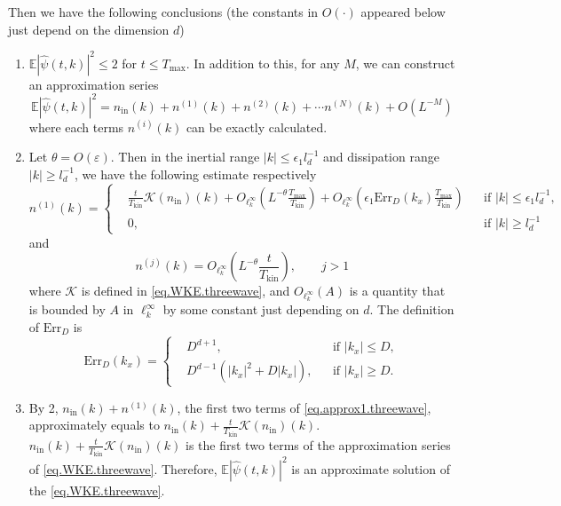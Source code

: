 \begin{thm}
Then we have the following conclusions (the constants in $O(\cdot)$ appeared below just depend on the dimension $d$)
\begin{enumerate}
    \item $\mathbb E |\widehat \psi(t, k)|^2\le 2$ for $t\le T_{\text{max}}$. In addition to this, for any $M$, we can construct an approximation series 
    \begin{equation}\label{eq.approx1.threewave}
        \mathbb E |\widehat \psi(t, k)|^2=n_{\mathrm{in}}(k)+n^{(1)}(k)+n^{(2)}(k)+\cdots n^{(N)}(k)+O(L^{-M})
    \end{equation}
    where each terms $n^{(i)}(k)$ can be exactly calculated.
    \item Let $\theta=O(\varepsilon)$. Then in the inertial range $|k|\le \epsilon_1 l_{d}^{-1}$ and dissipation range $|k|\ge l_d^{-1}$, we have the following estimate respectively
    \begin{equation}\label{eq.n1.threewave}
        n^{(1)}(k)=\left\{
        \begin{aligned}
            &\frac{t}{T_{\mathrm{kin}}}\mathcal K(n_{\mathrm{in}})(k)+O_{\ell^\infty_k}\left(L^{-\theta}\frac{T_{\text{max}}}{T_{\mathrm {kin}}}\right)+O_{\ell^\infty_k}\left(\epsilon_1\text{Err}_{D}(k_x)\frac{T_{\text{max}}}{T_{\mathrm {kin}}}\right)
            && \text{if } |k|\le \epsilon_1 l_{d}^{-1},
            \\
            &0, && \text{if } |k|\ge  l_{d}^{-1}
        \end{aligned}\right.
    \end{equation}%
    and 
    \begin{equation}\label{eq.n(j)estimate.threewave}
        n^{(j)}(k)=O_{\ell^\infty_k}\left(L^{-\theta}\frac{t}{T_{\mathrm {kin}}}\right), \qquad j>1
    \end{equation}
    where $\mathcal K$ is defined in \eqref{eq.WKE.threewave}, and $O_{\ell^\infty_k}(A)$ is a quantity that is bounded by $A$ in $\ell^\infty_k$ by some constant just depending on $d$. The definition of $\text{Err}_D$ is 
    \begin{equation}
        \text{Err}_{D}(k_x)=\left\{\begin{aligned}
             &D^{d+1}, && \text{if } |k_x|\le D,
            \\
            &D^{d-1}(|k_x|^2+D|k_x|), && \text{if } |k_x|\ge D.
        \end{aligned}
        \right.
    \end{equation}
    \item By 2, $n_{\mathrm{in}}(k)+n^{(1)}(k)$, the first two terms of \eqref{eq.approx1.threewave}, approximately equals to $n_{\mathrm{in}}(k)+\frac{t}{T_{\mathrm{kin}}}\mathcal K(n_{\mathrm{in}})(k)$. $n_{\mathrm{in}}(k)+\frac{t}{T_{\mathrm{kin}}}\mathcal K(n_{\mathrm{in}})(k)$ is the first two terms of the approximation series of \eqref{eq.WKE.threewave}. Therefore, $\mathbb E |\widehat \psi(t, k)|^2$ is an approximate solution of the \eqref{eq.WKE.threewave}.
\end{enumerate}


\end{thm}

